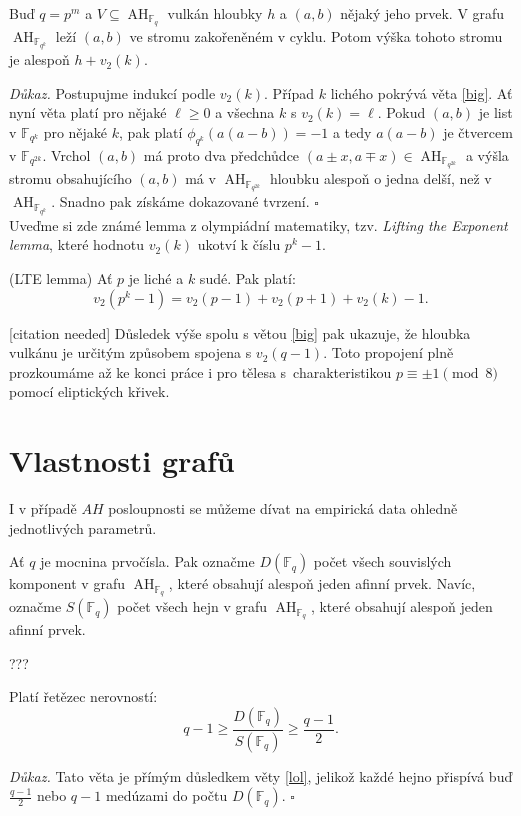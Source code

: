 \documentclass[12pt]{report}
\DeclareMathOperator{\AH}{AH}
\begin{document}
\begin{dusledek}\label{hloub}
Buď $q = p^m$ a $V \subseteq \AH_{\mathbb{F}_q}$ vulkán hloubky $h$ a $(a,b)$ nějaký jeho prvek. V grafu $\AH_{\mathbb{F}_{q^k}}$ leží $(a,b)$ ve stromu zakořeněném v cyklu. Potom výška tohoto stromu je alespoň $h+v_2(k)$.
\end{dusledek}
\noindent \textit{Důkaz.} Postupujme indukcí podle $v_2(k)$. Případ $k$ lichého pokrývá věta \ref{big}. Ať nyní věta platí pro nějaké $\ell \geqslant 0$ a všechna $k$ s $v_2 (k) = \ell$. Pokud $(a,b)$ je list v $\mathbb{F}_{q^k}$ pro nějaké $k$, pak platí $\phi_{q^k} (a(a-b)) = -1$ a tedy $a(a-b)$ je čtvercem v $\mathbb{F}_{q^{2k}}$. Vrchol $(a,b)$ má proto dva předchůdce $(a\pm x,a\mp x) \in \AH_{\mathbb{F}_{q^{2k}}}$  a výšla stromu obsahujícího $(a,b)$ má v $\AH_{\mathbb{F}_{q^{2k}}}$ hloubku alespoň o jedna delší, než v $\AH_{\mathbb{F}_{q^{k}}}$. Snadno pak získáme dokazované tvrzení. \hfill $\square$\\

Uveďme si zde známé lemma z olympiádní matematiky, tzv. \textit{Lifting the Exponent lemma}, které hodnotu $v_2(k)$ ukotví k číslu $p^k - 1$. 
\begin{veta}(LTE lemma)
Ať $p$ je liché a $k$ sudé. Pak platí:
$$v_2 (p^k - 1) = v_2(p-1)+v_2 (p+1) + v_2 (k) - 1.$$
\end{veta}
[citation needed] Důsledek výše spolu s větou \ref{big} pak ukazuje, že hloubka vulkánu je určitým způsobem spojena s $v_2 (q-1)$. Toto propojení plně prozkoumáme až ke konci práce i pro tělesa s~charakteristikou $p \equiv \pm 1 \pmod{8}$ pomocí eliptických křivek.

\section{Vlastnosti grafů}

I v případě $AH$ posloupnosti se můžeme dívat na empirická data ohledně jednotlivých parametrů.

\begin{definice}
Ať $q$ je mocnina prvočísla. Pak označme $D(\mathbb{F}_q)$ počet všech souvislých komponent v grafu $\AH_{\mathbb{F}_q}$, které obsahují alespoň jeden afinní prvek. Navíc, označme $S(\mathbb{F}_q)$ počet všech hejn v grafu $\AH_{\mathbb{F}_q}$, které obsahují alespoň jeden afinní prvek.
\end{definice}
???
\begin{veta}
Platí řetězec nerovností:
$$q-1 \geqslant \frac{D(\mathbb{F}_q)}{S(\mathbb{F}_q)} \geqslant \frac{q-1}{2}.$$
\end{veta}
\noindent \textit{Důkaz.} Tato věta je přímým důsledkem věty \ref{lol}, jelikož každé hejno přispívá buď $\frac{q-1}{2}$ nebo $q-1$ medúzami do počtu $D(\mathbb{F}_q)$. \hfill $\square$\\
\end{document}
